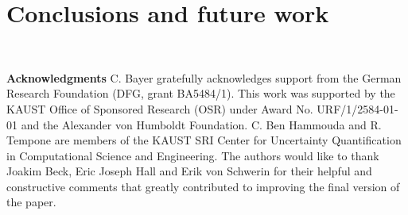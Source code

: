 \documentclass[11pt]{article}
\begin{document}
\section{Conclusions and future work}



\

\textbf{Acknowledgments} C. Bayer gratefully acknowledges support from the German Research Foundation (DFG, grant BA5484/1). This work was supported by the KAUST Office of Sponsored Research (OSR) under Award No. URF/1/2584-01-01 and the Alexander von Humboldt Foundation. C. Ben Hammouda and R. Tempone are members of the KAUST SRI Center for Uncertainty Quantification in Computational Science and Engineering. The authors would like to thank Joakim Beck, Eric Joseph Hall and Erik von Schwerin for their helpful and constructive comments that greatly contributed to improving the final version of the paper. 





 




%






 

 

 
 
 
\end{document}
